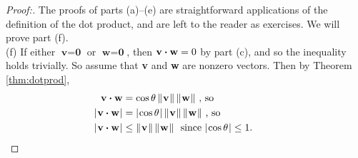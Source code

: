 \begin{proofbar}\vspace{-3mm}\begin{proof}[Proof:]
 The proofs of parts (a)--(e) are straightforward applications of the definition of the dot product, and are left
 to the reader as exercises. We will prove part (f).\\(f)
 If either $\textbf{v} = \textbf{0}$ or $\textbf{w} = \textbf{0}$, then $\textbf{v} \bm{\cdot} \textbf{w} = 0$
 by part (c), and so the inequality holds trivially. So assume that \textbf{v} and \textbf{w} are nonzero vectors. Then
 by Theorem \ref{thm:dotprod},
 \begin{align*}
  \textbf{v} \bm{\cdot} \textbf{w} &= \cos \theta \, \lVert\mspace{1mu}\textbf{v}\mspace{1mu}\rVert\,\lVert\mspace{1mu}\textbf{w}\mspace{1mu}\rVert \text{~,~so}\\
  \lvert\mspace{1mu}\textbf{v} \bm{\cdot} \textbf{w}\mspace{1mu}\rvert &= \lvert\mspace{1mu}\cos \theta\mspace{1mu}\rvert \, \lVert\mspace{1mu}\textbf{v}\mspace{1mu}\rVert\,\lVert\mspace{1mu}\textbf{w}\mspace{1mu}\rVert \text{~,~so}\\
  \lvert\mspace{1mu}\textbf{v} \bm{\cdot} \textbf{w}\mspace{1mu}\rvert &\le \lVert\mspace{1mu}\textbf{v}\mspace{1mu}\rVert\,\lVert\mspace{1mu}\textbf{w}\mspace{1mu}\rVert
   \text{~~since $\lvert\mspace{1mu}\cos \theta\mspace{1mu}\rvert \le 1$. \qquad \qedhere}
 \end{align*}
\end{proof}\vspace{-3mm}\end{proofbar}

